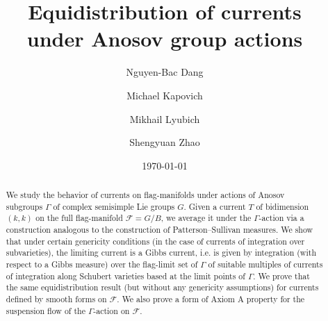 \documentclass[12pt]{amsbook}%
\date{\today}
\title[Equidistribution of currents]{Equidistribution of currents\\ under Anosov group actions}
\author[N.-B. Dang]{Nguyen-Bac Dang}
\author[M. Kapovich]{Michael Kapovich}
\author[M. Lyubich]{Mikhail Lyubich}
\author[S. Zhao]{Shengyuan Zhao}
\theoremstyle{definition}
\theoremstyle{remark}
\numberwithin{section}{chapter}
\numberwithin{subsection}{section}
\numberwithin{figure}{chapter}
\def\cF{{\mathscr{F}}}
\def\Ga{\Gamma}
\def\kap{}
\begin{document}
\begin{abstract}
We study the behavior of currents on flag-manifolds under actions of Anosov subgroups $\Ga$ of complex semisimple Lie groups $G$. 
Given a current $T$ of bidimension $(k,k)$ on the full flag-manifold $\cF=G/B$, we average it under the $\Ga$-action via a construction analogous to the construction 
of Patterson--Sullivan measures. We show that under certain genericity conditions (in the case of currents of integration over subvarieties), 
the limiting current is a Gibbs current, i.e. is given by integration (with respect to a Gibbs measure) over the flag-limit set of $\Ga$ of  suitable multiples of currents of integration along Schubert varieties based at the limit points of $\Ga$. We prove that the same equidistribution result (but without any genericity assumptions) for currents defined by smooth forms on $\cF$. {We also prove a form of { Axiom A property} for the suspension flow of the $\Ga$-action on $\cF$.  }
\end{abstract}


\maketitle



\tableofcontents

\mainmatter
\end{document}
